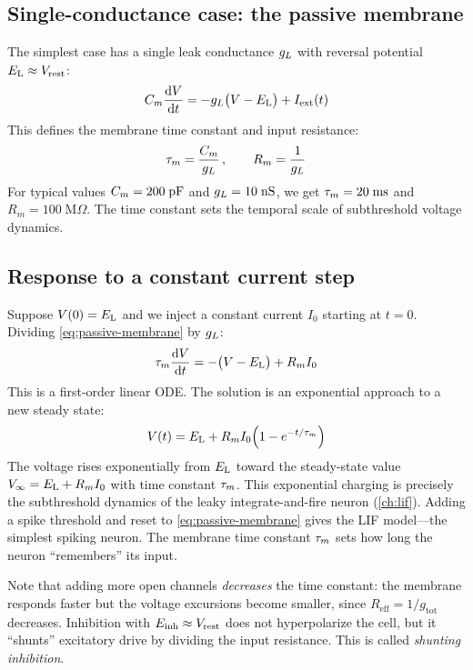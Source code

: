 \subsection{Single-conductance case: the passive membrane}

The simplest case has a single leak conductance $g_L$ with reversal potential $E_{\mathrm{L}} \approx V_{\text{rest}}$:
%
\begin{equation}
  C_m\frac{\mathop{}\!\mathrm{d} V}{\mathop{}\!\mathrm{d} t} = -g_L\bigl(V - E_{\mathrm{L}}\bigr) + I_{\text{ext}}(t)
  \label{eq:passive-membrane}
\end{equation}
%
This defines the membrane time constant and input resistance:
%
\begin{equation}
  \tau_m = \frac{C_m}{g_L}\,, \qquad R_m = \frac{1}{g_L}
  \label{eq:tau-Rm}
\end{equation}
%
For typical values $C_m = 200\;\text{pF}$ and $g_L = 10\;\text{nS}$, we get $\tau_m = 20\;\text{ms}$ and $R_m = 100\;\text{M}\Omega$. The time constant sets the temporal scale of subthreshold voltage dynamics.

\subsection{Response to a constant current step}

Suppose $V(0) = E_{\mathrm{L}}$ and we inject a constant current $I_0$ starting at $t = 0$. Dividing \cref{eq:passive-membrane} by $g_L$:
%
\begin{equation}
  \tau_m \frac{\mathop{}\!\mathrm{d} V}{\mathop{}\!\mathrm{d} t} = -\bigl(V - E_{\mathrm{L}}\bigr) + R_m I_0
  \label{eq:passive-rewritten}
\end{equation}
%
This is a first-order linear ODE. The solution is an exponential approach to a new steady state:
%
\begin{equation}
  V(t) = E_{\mathrm{L}} + R_m I_0 \Bigl(1 - e^{-t/\tau_m}\Bigr)
  \label{eq:step-response}
\end{equation}
%
The voltage rises exponentially from $E_{\mathrm{L}}$ toward the steady-state value $V_\infty = E_{\mathrm{L}} + R_m I_0$ with time constant $\tau_m$. This exponential charging is precisely the subthreshold dynamics of the leaky integrate-and-fire neuron (\cref{ch:lif}). Adding a spike threshold and reset to \cref{eq:passive-membrane} gives the LIF model---the simplest spiking neuron. The membrane time constant $\tau_m$ sets how long the neuron ``remembers'' its input.

Note that adding more open channels \emph{decreases} the time constant: the membrane responds faster but the voltage excursions become smaller, since $R_{\text{eff}} = 1/g_{\text{tot}}$ decreases. Inhibition with $E_{\mathrm{\text{inh}}} \approx V_{\text{rest}}$ does not hyperpolarize the cell, but it ``shunts'' excitatory drive by dividing the input resistance. This is called \emph{shunting inhibition}.


